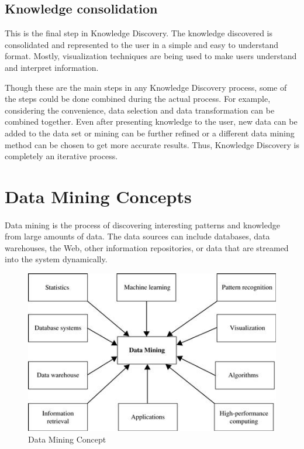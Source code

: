 \subsection{Knowledge consolidation}
This is the final step in Knowledge Discovery. The knowledge discovered is consolidated and represented to the user in a simple and easy to understand format. Mostly, visualization techniques are being used to make users understand and interpret information. \newline

Though these are the main steps in any Knowledge Discovery process, some of the steps could be done combined during the actual process.  For example, considering the convenience, data selection and data transformation can be combined together. Even after presenting knowledge to the user, new data can be added to the data set or mining can be further refined or a different data mining method can be chosen to get more accurate results. Thus, Knowledge Discovery is completely an iterative process.



\section{Data Mining Concepts}

\paragraph{}
Data mining is the process of discovering interesting patterns and knowledge from large amounts of data. The
data sources can include databases, data warehouses, the Web, other information repositories, or data that are
streamed into the system dynamically.
\begin{figure}
   \centering
  \includegraphics[width=\linewidth]{Figures/datamining.jpg}
  \decoRule
  \caption[Data Mining]{Data Mining Concept}
  \label{fig:datamining}
\end{figure}

